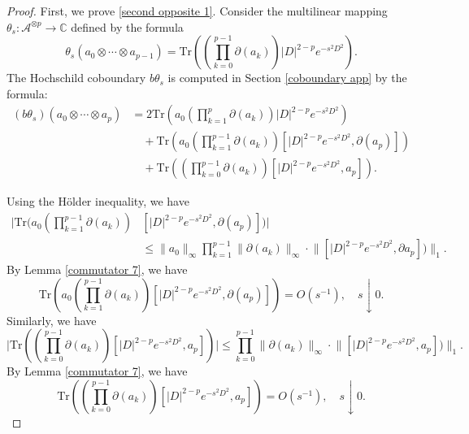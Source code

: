     \begin{proof} 
        First, we prove \eqref{second opposite 1}. Consider the multilinear mapping $\theta_s:\mathcal{A}^{\otimes p}\to\mathbb{C}$ defined by the formula
        \begin{equation*}
            \theta_s(a_0\otimes\cdots\otimes a_{p-1}) = \mathrm{Tr}(\left(\prod_{k=0}^{p-1}\partial(a_k)\right) |D|^{2-p}e^{-s^2D^2}).
        \end{equation*}
        The Hochschild coboundary $b\theta_s$ is computed in Section \ref{coboundary app} by the formula:
        \begin{align*}
            (b\theta_s)(a_0\otimes\cdots\otimes a_p) &= 2\mathrm{Tr}(a_0\left(\prod_{k=1}^p\partial(a_k)\right) |D|^{2-p}e^{-s^2D^2})\\
                                                     &\quad +\mathrm{Tr}(a_0\left(\prod_{k=1}^{p-1}\partial(a_k)\right)[|D|^{2-p}e^{-s^2D^2},\partial(a_p)])\\
                                                     &\quad +\mathrm{Tr}(\left(\prod_{k=0}^{p-1}\partial(a_k)\right) [|D|^{2-p}e^{-s^2D^2},a_p]).
        \end{align*}

        Using the H\"older inequality, we have
        \begin{align*}
            \Big|\mathrm{Tr}(a_0\left(\prod_{k=1}^{p-1}\partial(a_k)\right)&[|D|^{2-p}e^{-s^2D^2},\partial(a_p)])\Big|\\
                                                                   &\leq\|a_0\|_{\infty}\prod_{k=1}^{p-1}\|\partial(a_k)\|_{\infty}\cdot\Big\|[|D|^{2-p}e^{-s^2D^2},\partial a_p])\Big\|_1.
        \end{align*}
        By Lemma \ref{commutator 7}, we have
        \begin{equation}\label{sec op eq1}
            \mathrm{Tr}(a_0\left(\prod_{k=1}^{p-1}\partial(a_k)\right) [|D|^{2-p}e^{-s^2D^2},\partial(a_p)]) = O(s^{-1}),\quad s\downarrow0.
        \end{equation}
        Similarly, we have
        \begin{equation*}
            \Big|\mathrm{Tr}(\left(\prod_{k=0}^{p-1}\partial(a_k)\right) [|D|^{2-p}e^{-s^2D^2},a_p])\Big| \leq \prod_{k=0}^{p-1}\|\partial(a_k)\|_{\infty}\cdot\Big\|[|D|^{2-p}e^{-s^2D^2},a_p])\Big\|_1.
        \end{equation*}
        By Lemma \ref{commutator 7}, we have
        \begin{equation}\label{sec op eq2}
            \mathrm{Tr}(\left(\prod_{k=0}^{p-1}\partial(a_k)\right) [|D|^{2-p}e^{-s^2D^2},a_p])=O(s^{-1}),\quad s\downarrow0.
        \end{equation}


\end{proof}
